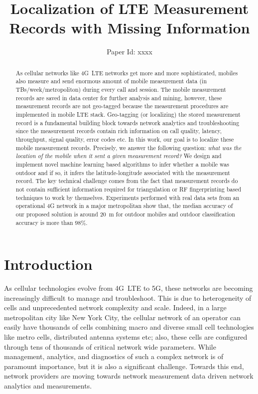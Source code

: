\documentclass[conference, 10pt]{IEEEtran}
\title{Localization of LTE Measurement Records with Missing Information}
\author{Paper Id: xxxx}
\begin{document}
\maketitle


\begin{abstract}

As cellular networks like 4G~LTE networks get more and more sophisticated, mobiles
also measure and send enormous amount of mobile measurement data (in
TBs/week/metropoliton) during every call and session. The mobile measurement records
are saved in data center for further analysis and mining, however, these measurement
records are not geo-tagged because the measurement procedures are implemented in
mobile LTE stack. Geo-tagging (or localizing) the stored measurement record is a
fundamental building block towards network analytics and troubleshooting since the
measurement records contain  rich information on call quality, latency, throughput,
signal quality, error codes etc. In this work, our goal is to localize these mobile
measurement records. Precisely, we answer the following question: {\em what was the
location of the mobile when it sent a given measurement record?} We design and
implement novel machine learning based algorithms to infer whether a mobile was
outdoor and if so, it infers the latitude-longitude associated with the measurement
record. The key technical challenge comes from the fact that measurement records do
not contain sufficient information required for triangulation or RF fingerprinting
based techniques to work by themselves. Experiments performed with real data sets
from an operational 4G network in a major metropolitan show that, the median accuracy
of our proposed solution is around 20~m for outdoor mobiles and outdoor
classification accuracy is more than $98\%$.

\end{abstract}


\section{Introduction}




As cellular technologies evolve from 4G~LTE to 5G, these networks are becoming
increasingly difficult to manage and troubleshoot. This is due to heterogeneity of
cells and unprecedented network complexity and scale. Indeed, in a large metropolitan
city like New York City, the cellular network of an operator can easily have
thousands of cells combining macro and diverse small cell technologies like metro
cells, distributed antenna systems etc; also, these cells are configured through tens
of thousands of critical network wide parameters. While management, analytics, and
diagnostics of such a complex network is of paramount importance, but it is also a
significant challenge. Towards this end, network providers are moving towards network
measurement data driven network analytics and measurements.
\end{document}

